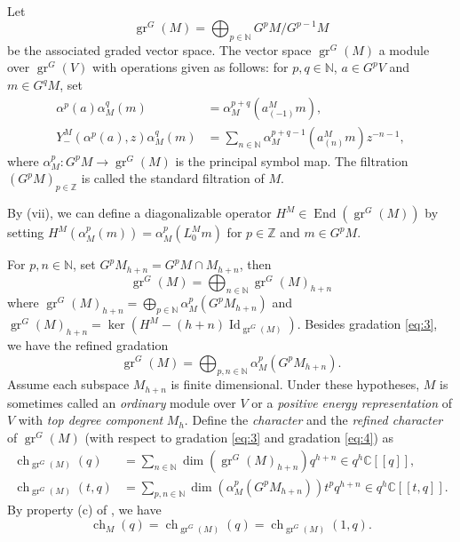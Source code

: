 \documentclass[a4paper, 12pt, reqno]{amsart}
\theoremstyle{remark}
\DeclareMathOperator{\Id}{Id}
\DeclareMathOperator{\gr}{gr}
\DeclareMathOperator{\End}{End}
\DeclareMathOperator{\ch}{ch}
\begin{document}
Let
\begin{equation*}
  \gr^G(M) = \bigoplus_{p \in \mathbb{N}}G^pM/G^{p - 1}M
\end{equation*}
be the associated graded vector space.
The vector space $\gr^G(M)$ a module over $\gr^G(V)$ with operations given as follows: for $p, q \in \mathbb{N}$, $a \in G^pV$ and $m \in G^qM$, set
\begin{align*}
  \alpha^p(a)\alpha_M^q(m) &= \alpha_M^{p + q}(a^M_{(-1)}m), \\
  Y^M_-(\alpha^p(a), z)\alpha_M^q(m) &= \sum_{n \in \mathbb{N}}\alpha_M^{p + q - 1}(a^M_{(n)}m)z^{-n - 1},
\end{align*}
where $\alpha_M^p: G^pM \to \gr^G(M)$ is the principal symbol map.
The filtration $(G^pM)_{p \in \mathbb{Z}}$ is called the standard filtration of $M$.

By (vii), we can define a diagonalizable operator $H^M \in \End(\gr^G(M))$ by setting $H^M(\alpha^p_M(m)) = \alpha^p_M(L^M_0m)$ for $p \in \mathbb{Z}$ and $m \in G^pM$.

For $p, n \in \mathbb{N}$, set $G^pM_{h + n} = G^pM \cap M_{h + n}$, then
\begin{equation}
  \label{eq:3}
  \gr^G(M) = \bigoplus_{n \in \mathbb{N}}\gr^G(M)_{h + n}
\end{equation}
where $\gr^G(M)_{h + n} = \bigoplus_{p \in \mathbb{N}}\alpha^p_M(G^pM_{h + n})$ and $\gr^G(M)_{h + n} = \ker(H^M - (h + n)\Id_{\gr^G(M)})$.
Besides gradation \eqref{eq:3}, we have the refined gradation
\begin{equation}
  \label{eq:4}
  \gr^G(M) = \bigoplus_{p, n \in \mathbb{N}}\alpha^p_M(G^pM_{h + n}).
\end{equation}
Assume each subspace $M_{h + n}$ is finite dimensional.
Under these hypotheses, $M$ is sometimes called an \emph{ordinary} module over $V$ or  a \emph{positive energy representation} of $V$ with \emph{top degree component} $M_h$.
Define the \emph{character} and the \emph{refined character} of $\gr^G(M)$ (with respect to gradation \eqref{eq:3} and gradation \eqref{eq:4}) as
\begin{align*}
  \ch_{\gr^G(M)}(q) &= \sum_{n \in \mathbb{N}}\dim(\gr^G(M)_{h + n})q^{h + n} \in q^h\mathbb{C}[[q]],\\
  \ch_{\gr^G(M)}(t, q) &= \sum_{p, n \in \mathbb{N}}\dim(\alpha^p_M(G^pM_{h + n}))t^pq^{h + n} \in q^{h}\mathbb{C}[[t, q]].
\end{align*}
By property (c) of , we have
\begin{equation*}
  \ch_M(q) = \ch_{\gr^G(M)}(q) = \ch_{\gr^G(M)}(1, q).
\end{equation*}
\end{document}
